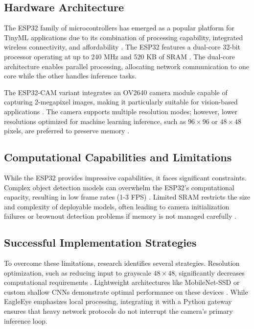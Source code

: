 \documentclass[12pt, a4paper]{article}
\begin{document}
\subsection{Hardware Architecture}
The ESP32 family of microcontrollers has emerged as a popular platform for TinyML applications due to its combination of processing capability, integrated wireless connectivity, and affordability \cite{ref4}. The ESP32 features a dual-core 32-bit processor operating at up to 240 MHz and 520 KB of SRAM \cite{ref4, ref15}. The dual-core architecture enables parallel processing, allocating network communication to one core while the other handles inference tasks.

The ESP32-CAM variant integrates an OV2640 camera module capable of capturing 2-megapixel images, making it particularly suitable for vision-based applications \cite{ref2, ref16}. The camera supports multiple resolution modes; however, lower resolutions optimized for machine learning inference, such as $96\times96$ or $48\times48$ pixels, are preferred to preserve memory \cite{ref2, ref17}.

\subsection{Computational Capabilities and Limitations}
While the ESP32 provides impressive capabilities, it faces significant constraints. Complex object detection models can overwhelm the ESP32's computational capacity, resulting in low frame rates (1-3 FPS) \cite{ref18, ref19, ref20, ref21}. Limited SRAM restricts the size and complexity of deployable models, often leading to camera initialization failures or brownout detection problems if memory is not managed carefully \cite{ref15, ref22}.

\subsection{Successful Implementation Strategies}
To overcome these limitations, research identifies several strategies. Resolution optimization, such as reducing input to grayscale $48\times48$, significantly decreases computational requirements \cite{ref17}. Lightweight architectures like MobileNet-SSD or custom shallow CNNs demonstrate optimal performance on these devices \cite{ref23, ref24}. While EagleEye emphasizes local processing, integrating it with a Python gateway ensures that heavy network protocols do not interrupt the camera's primary inference loop.
\end{document}
